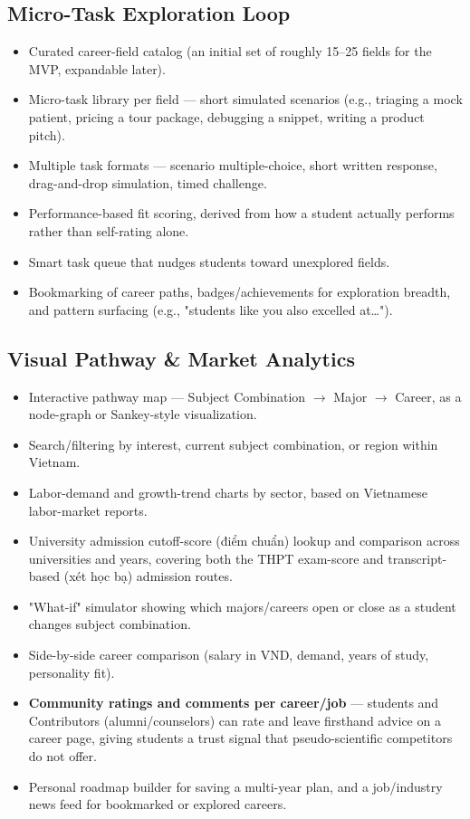 \documentclass[a4paper]{article}
\begin{document}
\subsection{Micro-Task Exploration Loop}
\begin{itemize}
    \item Curated career-field catalog (an initial set of roughly 15–25 fields for the MVP,
    expandable later).
    \item Micro-task library per field — short simulated scenarios (e.g., triaging a mock
    patient, pricing a tour package, debugging a snippet, writing a product pitch).
    \item Multiple task formats — scenario multiple-choice, short written response,
    drag-and-drop simulation, timed challenge.
    \item Performance-based fit scoring, derived from how a student actually performs rather
    than self-rating alone.
    \item Smart task queue that nudges students toward unexplored fields.
    \item Bookmarking of career paths, badges/achievements for exploration breadth, and pattern
    surfacing (e.g., "students like you also excelled at…").
\end{itemize}

\subsection{Visual Pathway \& Market Analytics}
\begin{itemize}
    \item Interactive pathway map — Subject Combination $\rightarrow$ Major $\rightarrow$
    Career, as a node-graph or Sankey-style visualization.
    \item Search/filtering by interest, current subject combination, or region within Vietnam.
    \item Labor-demand and growth-trend charts by sector, based on Vietnamese labor-market
    reports.
    \item University admission cutoff-score (điểm chuẩn) lookup and comparison across
    universities and years, covering both the THPT exam-score and transcript-based
    (xét học bạ) admission routes.
    \item "What-if" simulator showing which majors/careers open or close as a student changes
    subject combination.
    \item Side-by-side career comparison (salary in VND, demand, years of study, personality
    fit).
    \item \textbf{Community ratings and comments per career/job} — students and Contributors
    (alumni/counselors) can rate and leave firsthand advice on a career page, giving students a
    trust signal that pseudo-scientific competitors do not offer.
    \item Personal roadmap builder for saving a multi-year plan, and a job/industry news feed
    for bookmarked or explored careers.
\end{itemize}
\end{document}
